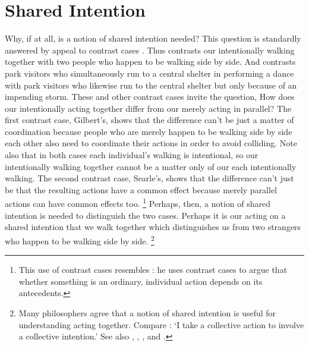 \documentclass[12pt,\papersize]{extarticle}
\begin{document}
\setlength\footnotesep{1em}


\maketitle
\title{}

\begin{abstract}
\noindent
***

\end{abstract}

\section{Shared Intention}
Why, if at all, is a notion of shared intention needed? 
This question is standardly answered by appeal to contrast cases \citep[compare][p.\ 150]{Bratman:2009lv}.
Thus \citet{gilbert_walking_1990} contrasts our intentionally walking together with two people who happen to be walking side by side. 
And \citet{Searle:1990em} contrasts park visitors who  simultaneously run to a central shelter in performing a dance with park visitors who likewise run to the central shelter but only because of an impending storm. 
These and other contrast cases invite the question, 
How does our intentionally acting together differ from our merely acting in parallel? 
The first contrast case, Gilbert's, shows that the difference can’t be just  a matter of coordination because people who are merely happen to be walking side by side each other also need to coordinate their actions in order to avoid colliding.  
Note also that in both cases each individual's walking is intentional, so our intentionally walking together cannot be a matter only of our each intentionally walking.
The second contrast case, Searle's, shows that the difference can’t just be that the resulting actions have a common effect because merely parallel actions can have common effects too.%
\footnote{
This use of contrast cases resembles \citet{Pears:1971fk}: he uses contrast cases to argue that whether something is an ordinary, individual action depends on its antecedents. 
} 
Perhaps, then, a notion of shared intention is needed to distinguish the two cases.  
Perhaps it is our acting on a shared intention that we walk together which distinguishes us from two strangers who happen to be walking side by side.%
\footnote{
Many philosophers agree that a notion of shared intention is useful for understanding acting together. 
Compare \citet[p.\ 5]{Gilbert:2006wr}: `I take a collective action to involve a collective intention.'  See also  
	\citet[p.\ 381]{Carpenter:2009wq}, 
	\citet[p.\ 369]{Call:2009fk}, 
	\citet{Kutz:2000si}, 
	\citet[p.\ 117]{rakoczy_pretend_2006} and 
	\citet{Tollefsen:2005vh}.
	}
	
\end{document}
